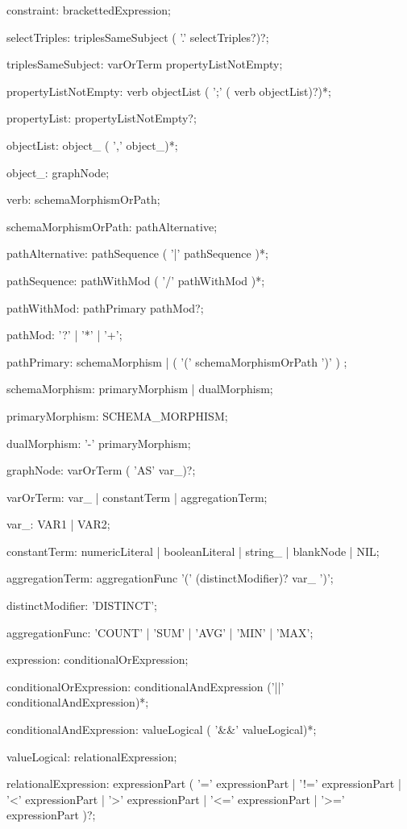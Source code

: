 \begin{code}
constraint: brackettedExpression;

selectTriples: triplesSameSubject ( '.' selectTriples?)?;

triplesSameSubject: varOrTerm propertyListNotEmpty;

propertyListNotEmpty: verb objectList ( ';' ( verb objectList)?)*;

propertyList: propertyListNotEmpty?;

objectList: object_ ( ',' object_)*;

object_: graphNode;

verb: schemaMorphismOrPath;

schemaMorphismOrPath: pathAlternative;

pathAlternative: pathSequence ( '|' pathSequence )*;

pathSequence: pathWithMod ( '/' pathWithMod )*;

pathWithMod: pathPrimary pathMod?;

pathMod: '?' | '*' | '+';

pathPrimary: schemaMorphism | ( '(' schemaMorphismOrPath ')' ) ;

schemaMorphism: primaryMorphism | dualMorphism;

primaryMorphism: SCHEMA_MORPHISM;

dualMorphism: '-' primaryMorphism;

graphNode: varOrTerm ( 'AS' var_)?;

varOrTerm: var_ | constantTerm | aggregationTerm;

var_: VAR1 | VAR2;

constantTerm:
	numericLiteral
	| booleanLiteral
	| string_
	| blankNode
	| NIL;

aggregationTerm:
	aggregationFunc '(' (distinctModifier)? var_ ')';

distinctModifier:
	'DISTINCT';

aggregationFunc:
	'COUNT'
	| 'SUM'
	| 'AVG'
	| 'MIN'
	| 'MAX';

expression: conditionalOrExpression;

conditionalOrExpression:
	conditionalAndExpression ('||' conditionalAndExpression)*;

conditionalAndExpression: valueLogical ( '&&' valueLogical)*;

valueLogical: relationalExpression;

relationalExpression:
	expressionPart (
		'=' expressionPart
		| '!=' expressionPart
		| '<' expressionPart
		| '>' expressionPart
		| '<=' expressionPart
		| '>=' expressionPart
	)?;


\end{code}
